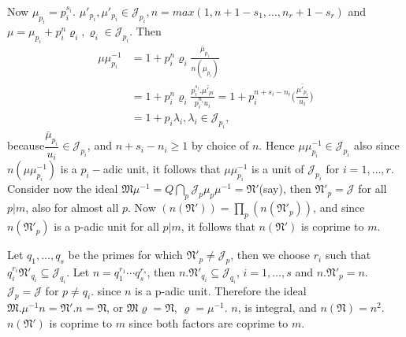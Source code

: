 Now $\mu_{p_i}= p_i ^{s_i}$. $\mu'_{p_i}, \mu'_{p_i} \in
\mathcal{J}_{p_i}, n= max (1,n + 1-s_1, \ldots,  n_r + 1-s_r)$ and
$\mu= \mu_{p_i}+p^n_i \varrho_i, \varrho 
_i \in \mathcal{J}_{p_i}$. Then  
\begin{align*}
  \mu \mu^{-1}_{p_i} &=1 + p^n_i \varrho_i \frac{\bar{\mu}_{p_i}}{n(\mu_{p_i})}\\
  &= 1 + p^n_i \varrho_i \frac{p_i^{s_i}. \bar{\mu'_{pi}}}{p_i^{n_i}
    u_i}=1 + p_i^{n+s_i - n_i} \bigg (
  \frac{\bar{\mu'_{p_i}}}{u_i}\bigg ) \\ 
  &= 1+  p_i \lambda_i, \lambda_i  \in  \mathcal{J}_{p_i},
\end{align*}
because\pageoriginale $\dfrac{\bar{\mu}_{p_i}}{u_i} \in \mathcal{J}_{p_i}$, and
$n+ s_i - n_i \ge 1$ by choice of $n$. Hence $\mu \mu^{-1}_{p_i} \in
\mathcal{J}_{p_i}$ also since $n(\mu \mu^{-1}_{p_i})$ is a $p_i-$adic
unit, it follows that $\mu \mu^{-1}_{p_i}$ is a unit of
$\mathcal{J}_{p_i}$ for $i=1, \ldots,  r$. Consider now the ideal
$\mathfrak{M} \mu^{-1}=Q \bigcap\limits_p \mathcal{J}_p \mu_p
\mu^{-1}= \mathfrak{N}'$(say), then $\mathfrak{N}'_p = \mathcal{J}$
for all $p |m$, also for almost all $p$. Now $(n(\mathfrak{N}'))=
\prod_p (n(\mathfrak{N}'_p))$, and since $n(\mathfrak{N}'_p)$ is a
p-adic unit for all $p|m$, it follows that $n(\mathfrak{N}')$ is
coprime to $m$.  

Let $q_1, \ldots,  q_s$ be the primes for which $\mathfrak{N}'_p \neq
\mathcal{J}_p$, then we choose $r_i$ such that $q_i^{r_i}
\mathfrak{N}'_{q_i} \subseteq \mathcal{J}_{q_i}$. Let $n=q_1^{r_1}
\cdots q_s^{r_s}$, then $n. \mathfrak{N}'_{q_i} \subseteq
\mathcal{J}_{q_i}$, $i=1, \ldots, s$ and $n. \mathfrak{N}'_p=
n$. $\mathcal{J}_p = \mathcal{J}$ for $p \neq q_i$. since $n$ is a
p-adic unit. Therefore the ideal $\mathfrak{M}. \mu^{-1} n =
\mathfrak{N}'. n  = \mathfrak{N}$, or $\mathfrak{M} \varrho =
\mathfrak{N}$, $\varrho = \mu^{-1}$. $n$, is integral, and
$n(\mathfrak{N})= n^2$.  $n (\mathfrak{N}')$ is coprime to $m$ since
both factors are coprime to $m$. 

